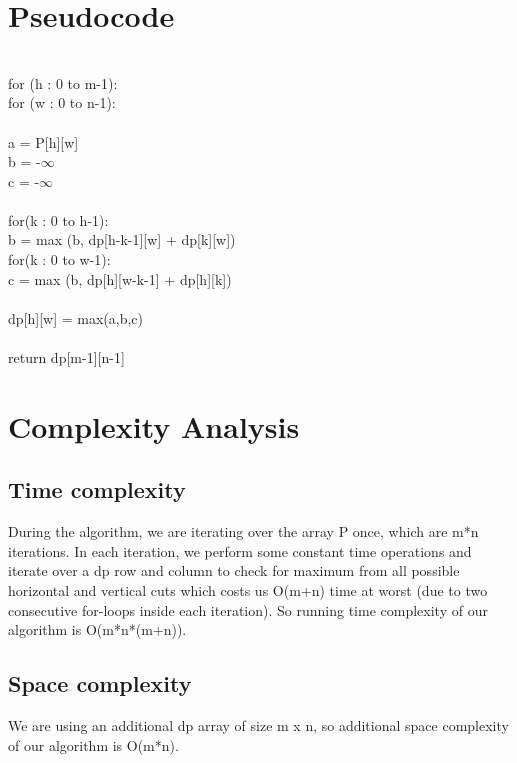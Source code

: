 \documentclass{article}
\begin{document}
\section{Pseudocode}
\begin{algorithm}
\begin{algorithmic}[1]
    \\
        \hspace{20pt}for (h : 0 to m-1):\\
        \hspace{40pt}for (w : 0 to n-1):\\
        \\
        \hspace{60pt}a = P[h][w]\\
        \hspace{60pt}b = -$\infty$\\
        \hspace{60pt}c = -$\infty$\\
        \\
        \hspace{60pt}for(k : 0 to h-1):\\
        \hspace{80pt}b = max (b, dp[h-k-1][w] + dp[k][w])\\
        \hspace{60pt}for(k : 0 to w-1):\\
        \hspace{80pt}c = max (b, dp[h][w-k-1] + dp[h][k])\\
        \\
        \hspace{60pt}dp[h][w] = max(a,b,c)\\
        \\
        \hspace{20pt}return dp[m-1][n-1]
    \EndFunction
\end{algorithmic}
\end{algorithm}


\section{Complexity Analysis}
\subsection{Time complexity}
During the algorithm, we are iterating over the array P once, which are m*n iterations. In each iteration, we perform some constant time operations and iterate over a dp row and column to check for maximum from all possible horizontal and vertical cuts which costs us O(m+n) time at worst (due to two consecutive for-loops inside each iteration). So running time complexity of our algorithm is O(m*n*(m+n)).\\

\subsection{Space complexity}
We are using an additional dp array of size m x n, so additional space complexity of our algorithm is O(m*n).
\end{document}
